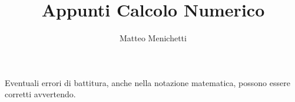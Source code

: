 \documentclass[a4paper,10pt]{article}
\numberwithin{equation}{section}
\theoremstyle{definition}
\begin{document}
\title{Appunti Calcolo Numerico}
\author{Matteo Menichetti}
\maketitle

\noindent Eventuali errori di battitura, anche nella notazione matematica, possono essere corretti avvertendo.

\tableofcontents

\clearpage

\printglossary























%
\end{document}
